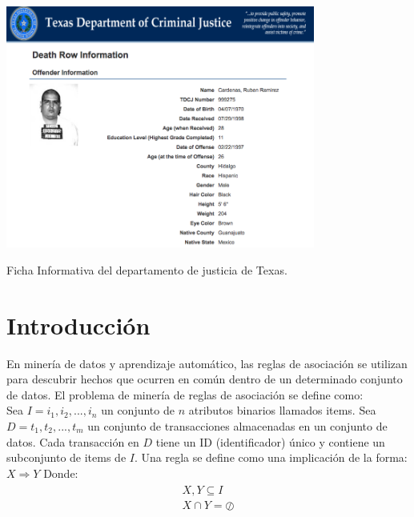 \documentclass[sigconf]{acmart}
\begin{document}
\begin{teaserfigure}
  \centering
  \includegraphics[width=4.0in]{C.png}
  \caption{Ficha Informativa del departamento de justicia de Texas.}
\end{teaserfigure}

\maketitle



\section{Introducción}
En minería de datos y aprendizaje automático, las reglas de asociación se utilizan para descubrir hechos que ocurren en común dentro de un determinado conjunto de datos. El problema de minería de reglas de asociación se define como:\\
Sea $I={i_{1},i_{2},...,i_{n}}$ un conjunto de ${n}$ atributos binarios llamados items.
Sea $D={t_{1},t_{2},...,t_{m}}$ un conjunto de transacciones almacenadas en un conjunto de datos.
Cada transacción en $D$ tiene un ID (identificador) único y contiene un subconjunto de items de $I$. 
Una regla se define como una implicación de la forma: $X\Rightarrow Y$
Donde:
\begin{eqnarray*}
\begin{matrix}
X,Y\subseteq I \\
X\cap Y =\oslash
\end{matrix}
\end{eqnarray*}
\end{document}
